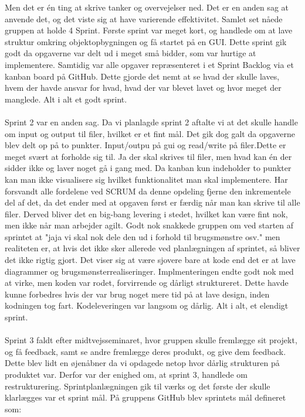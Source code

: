 Men det er én ting at skrive tanker og overvejelser ned. Det er en anden sag at anvende det, og det viste sig at have varierende effektivitet. Samlet set nåede gruppen at holde 4 Sprint. Første sprint var meget kort, og handlede om at lave struktur omkring objektopbygningen og få startet på en GUI. Dette sprint gik godt da opgaverne var delt ud i meget små bidder, som var hurtige at implementere. Samtidig var alle opgaver repræsenteret i et Sprint Backlog via et kanban board på GitHub. Dette gjorde det nemt at se hvad der skulle laves, hvem der havde ansvar for hvad, hvad der var blevet lavet og hvor meget der manglede. Alt i alt et godt sprint.\\\\
Sprint 2 var en anden sag. Da vi planlagde sprint 2 aftalte vi at det skulle handle om input og output til filer, hvilket er et fint mål. Det gik dog galt da opgaverne blev delt op på to punkter. Input/outpu på gui og read/write på filer.Dette er meget svært at forholde sig til. Ja der skal skrives til filer, men hvad kan én der sidder ikke og laver noget gå i gang med. Da kanban kun indeholder to punkter kan man ikke visualisere sig hvilket funktionalitet man skal implementere. Har forsvandt alle fordelene ved SCRUM da denne opdeling fjerne den inkrementele del af det, da det ender med at opgaven først er færdig når man kan skrive til alle filer. Derved bliver det en big-bang levering i stedet, hvilket kan være fint nok, men ikke når man arbejder agilt. Godt nok snakkede gruppen om ved starten af sprintet at "jaja vi skal nok dele den ud i forhold til brugsmønstre osv." men realiteten er, at hvis det ikke sker allerede ved planlægningen af sprintet, så bliver det ikke rigtig gjort. Det viser sig at være sjovere bare at kode end det er at lave diagrammer og brugsmønsterrealiseringer. Implmenteringen endte godt nok med at virke, men koden var rodet, forvirrende og dårligt struktureret. Dette havde kunne forbedres hvis der var brug noget mere tid på at lave design, inden kodningen tog fart. Kodeleveringen var langsom og dårlig. Alt i alt, et elendigt sprint.\\\\
Sprint 3 faldt efter midtvejsseminaret, hvor gruppen skulle fremlægge sit projekt, og få feedback, samt se andre fremlægge deres produkt, og give dem feedback. Dette blev lidt en øjenåbner da vi opdagede netop hvor dårlig strukturen på produktet var. Derfor var der enighed om, at sprint 3, handlede om restrukturering. Sprintplanlægningen gik til værks og det første der skulle klarlægges var et sprint mål. På gruppens GitHub blev sprintets mål defineret som: 

